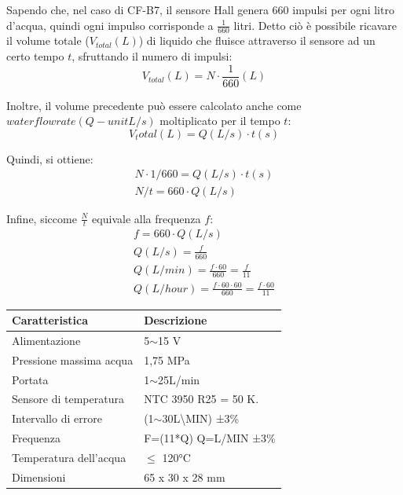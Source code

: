 Sapendo che, nel caso di CF-B7, il sensore Hall genera 660 impulsi per ogni litro d'acqua, quindi ogni impulso corrisponde a $\frac{1}{660}$ litri. Detto ciò è possibile ricavare il volume totale ($V_{total}(L)$) di liquido che fluisce attraverso il sensore ad un certo tempo $t$, sfruttando il numero di impulsi:
\[V_{total}(L) = N \cdot \frac{1}{660}(L) \]

Inoltre, il volume precedente può essere calcolato anche come $water flow rate(Q - unit L/s)$ moltiplicato per il tempo $t$:
\[V_total(L) = Q(L/s) \cdot t(s) \]

Quindi, si ottiene:
\begin{gather*}
    N \cdot 1/660 = Q(L/s) \cdot t(s) \\
    N/t = 660 \cdot Q(L/s)
\end{gather*}

Infine, siccome $\frac{N}{t}$ equivale alla frequenza $f$:
\begin{gather*}
    f = 660 \cdot Q(L/s) \\
    Q(L/s) = \frac{f}{660} \\
    Q(L/min) = \frac{f \cdot 60}{660} = \frac{f}{11} \\
    Q(L/hour) = \frac{f \cdot 60 \cdot 60}{660} = \frac{f \cdot 60}{11} 
\end{gather*}

\begin{table}[H]
    \centering
    \begin{tabular}{|l|l|}
    \hline
    \textbf{Caratteristica} & \textbf{Descrizione}                \\ \hline
    Alimentazione           & 5$\sim$15 V                         \\ \hline
    Pressione massima acqua & 1,75 MPa                            \\ \hline
    Portata                 & 1$\sim$25L/min                      \\ \hline
    Sensore di temperatura  & NTC 3950 R25 = 50 K.                \\ \hline
    Intervallo di errore    & (1$\sim$30L\textbackslash MIN) ±3\% \\ \hline
    Frequenza               & F=(11*Q) Q=L/MIN ±3\%                 \\ \hline
    Temperatura dell'acqua  & $\leq$ 120°C                              \\ \hline
    Dimensioni              & 65 x 30 x 28 mm                     \\ \hline
    \end{tabular}
\end{table}

